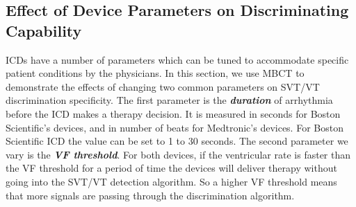  \subsection{Effect of Device Parameters on Discriminating Capability}
ICDs have a number of parameters which can be tuned to accommodate specific patient conditions by the physicians. 
In this section, we use MBCT to demonstrate the effects of changing two common parameters on SVT/VT discrimination specificity.
The first parameter is the \emph{\textbf{duration}} of arrhythmia before the ICD makes a therapy decision.
It is measured in seconds for Boston Scientific's devices, and in number of beats for Medtronic's devices. 
For Boston Scientific ICD the value can be set to 1 to 30 seconds.
%
The second parameter we vary is the \emph{\textbf{VF threshold}}.
For both devices, if the ventricular rate is faster than the VF threshold for a period of time the devices will deliver therapy without going into the SVT/VT detection algorithm. 
So a higher VF threshold means that more signals are passing through the discrimination algorithm.

